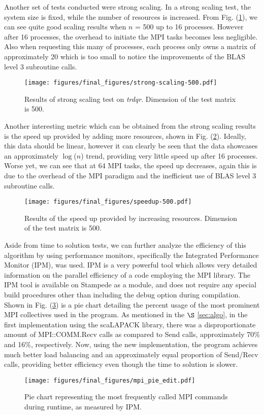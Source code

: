 \documentclass[twocolumn]{article}
\begin{document}
Another set of tests conducted were strong scaling.  In a strong scaling test, the system size is fixed, while the number of resources is increased.  From Fig. (\ref{fig:strong}),  we can see quite good scaling results when $n$ = 500 up to 16 processes.  However after 16 processes, the overhead to initiate the MPI tasks becomes less negligible.  Also when requesting this many of processes, each process only owns a matrix of approximately 20 which is too small to notice the improvements of the BLAS level 3 subroutine calls.  
\vspace{-0.2cm}
\begin{figure}[ht]
\texttt{[image: figures/final\_figures/strong-scaling-500.pdf]}
\caption{Results of strong scaling test on \textit{trdqr}. Dimension of the test matrix is 500.}
\label{fig:strong}
\end{figure}

Another interesting metric which can be obtained from the strong scaling results is the speed up provided by adding more resources, shown in Fig. (\ref{fig:speedup}).  Ideally, this data should be linear, however it can clearly be seen that the data showcases an approximately $\log$($n$) trend, providing very little speed up after 16 processes.  Worse yet, we can see that at 64 MPI tasks, the speed up decreases, again this is due to the overhead of the MPI paradigm and the inefficient use of BLAS level 3 subroutine calls.
\begin{figure}[ht]
\texttt{[image: figures/final\_figures/speedup-500.pdf]}
\caption{Results of the speed up provided by increasing resources. Dimension of the test matrix is 500.}
\label{fig:speedup}
\end{figure}

Aside from time to solution tests, we can further analyze the efficiency of this algorithm by using performance monitors, specifically the Integrated Performance Monitor (IPM)\cite{IPM}, was used.  IPM is a very powerful tool which allows very detailed information on the parallel efficiency of a code employing the MPI library.  The IPM tool is available on Stampede as a module, and does not require any special build procedures other than including the debug option during compilation.  Shown in Fig. (\ref{fig:mpipie}) is a pie chart detailing the percent usage of the most prominent MPI collectives used in the program.  As mentioned in the $\S$ \ref{sec:algo}, in the first implementation using the scaLAPACK library, there was a disproportionate amount of MPI::COMM.Recv calls as compared to Send calls, approximately 70$\%$ and 16$\%$, respectively.  Now, using the new implementation, the program achieves much better load balancing and an approximately equal proportion of Send/Recv calls, providing better efficiency even though the time to solution is slower.
\vspace{-0.4cm}
\begin{center}
\begin{figure}[ht]
\texttt{[image: figures/final\_figures/mpi\_pie\_edit.pdf]}
\caption{Pie chart representing the most frequently called MPI commands during runtime, as measured by IPM.}
\label{fig:mpipie}
\end{figure}
\end{center}
\end{document}
